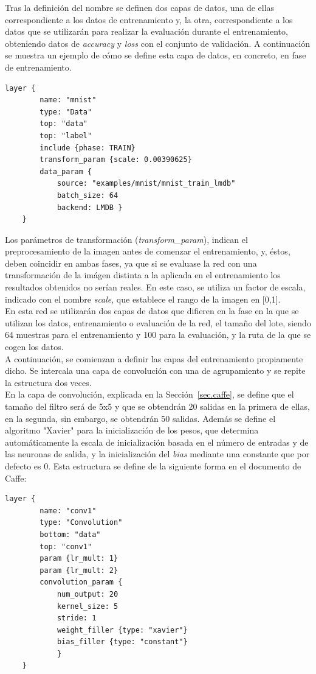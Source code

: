 	Tras la definición del nombre se definen dos capas de datos, una de ellas correspondiente a los datos de entrenamiento y, la otra, correspondiente a los datos que se utilizarán para realizar la evaluación durante el entrenamiento, obteniendo datos de \textit{accuracy} y \textit{loss} con el conjunto de validación. A continuación se muestra un ejemplo de cómo se define esta capa de datos, en concreto, en fase de entrenamiento.
	\vspace{10pt}
	\begin{lstlisting}[frame=single]
	layer {
		name: "mnist"
		type: "Data"
		top: "data"
		top: "label"
		include {phase: TRAIN}
		transform_param {scale: 0.00390625}
		data_param {
			source: "examples/mnist/mnist_train_lmdb"
			batch_size: 64
			backend: LMDB }
	}
	\end{lstlisting}
	
	Los parámetros de transformación (\textit{transform\_param}), indican el preprocesamiento de la imagen antes de comenzar el entrenamiento, y, éstos, deben coincidir en ambas fases, ya que si se evaluase la red con una transformación de la imágen distinta a la aplicada en el entrenamiento los resultados obtenidos no serían reales. En este caso, se utiliza un factor de escala, indicado con el nombre \textit{scale}, que establece el rango de la imagen en [0,1]. \\
	En esta red se utilizarán dos capas de datos que difieren en la fase en la que se utilizan los datos, entrenamiento o evaluación de la red, el tamaño del lote, siendo 64 muestras para el entrenamiento y 100 para la evaluación, y la ruta de la que se cogen los datos.\\
	
	A continuación, se comienzan a definir las capas del entrenamiento propiamente dicho. Se intercala una capa de convolución con una de agrupamiento y se repite la estructura dos veces.\\
	
	En la capa de convolución, explicada en la Sección~\ref{sec.caffe}, se define que el tamaño del filtro será de 5x5 y que se obtendrán 20 salidas en la primera de ellas, en la segunda, sin embargo, se obtendrán 50 salidas. Además se define el algoritmo "Xavier" para la inicialización de los pesos, que determina automáticamente la escala de inicialización basada en el número de entradas y de las neuronas de salida, y la inicialización del \textit{bias} mediante una constante que por defecto es 0. Esta estructura se define de la siguiente forma en el documento de Caffe:
	\vspace{10pt}
	\begin{lstlisting}[frame=single]
	layer {
		name: "conv1"
		type: "Convolution"
		bottom: "data"
		top: "conv1"
		param {lr_mult: 1}
		param {lr_mult: 2}
		convolution_param {
			num_output: 20
			kernel_size: 5
			stride: 1
			weight_filler {type: "xavier"}
			bias_filler {type: "constant"}
			}
	}	
	\end{lstlisting}
	
